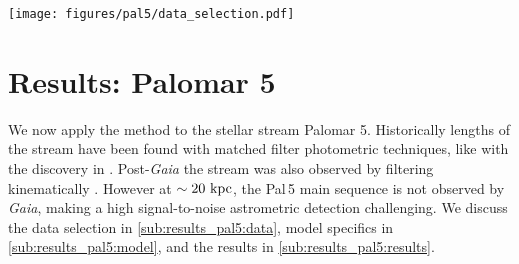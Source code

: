 \documentclass[twocolumn, linenumbers]{aastex631}
\newcommand{\stream}[1]{#1}
\newcommand{\dataarchive}[1]{\textit{#1}}
\newcommand{\Gaia}{\dataarchive{Gaia}}
\newcommand{\parallax}{\varpi}
\begin{document}


    \begin{figure*}[ht]
        \centering
        \texttt{[image: figures/pal5/data\_selection.pdf]}
        \caption{%
            Data selections for \stream{Pal\,5}, within the data cube described
            in \autoref{sub:results_pal5:data}.
            \textbf{Row 1:}
            Proper motion and photometric selections.  \stream{Pal\,5} is
            apparent in the proper motions as a small overdensity. The
            photometric selection is based on a 12 Gyr, [Fe/H] = $-1.2$ MIST
            isochrone, buffered by 0.3 dex. The photometry is also cut to
            \Gaia{}'s $G\leq20$ mag, before applying the isochrone selection.
            In green is plotted an ``on''-stream selection (see $\phi_1, \phi_2$ plot). The stream's isochrone is somewhat apparent, but the
            background contamination is large.
            \textbf{Rows 2 \& 3:}
            Applying the combination of astrometric and photometric selections (Row 1, blue regions),
            plotted for astrometric coordinates $\phi_2, \parallax,
            \mu_{\phi_1}, \mu_{\phi_2}$.  The stream is an identifiable
            overdensity in only $\phi_2$ and errors dominate all other
            coordinates.
            \textbf{Row 2, left:}
            Green points define an``on"-stream region. Light blue points are the background and are used to train the background photometric
            model (\autoref{sub:results_pal5:model}). The \stream{M5} cluster is masked from the stream, cutting into the on-stream selection.
        }
        \label{fig:pal5-data_selection}
    \end{figure*}



\section{Results: Palomar 5} \label{sec:results_pal5}

    We now apply the method to the stellar stream \stream{Palomar 5}.
    Historically lengths of the stream have been found with matched filter
    photometric techniques, like with the discovery in \citet{Odenkirchen+2001}.
    Post-\Gaia{} the stream was also observed by filtering kinematically
    \cite[e.g.,][]{Starkman+2019, Ibata+2021}.  However at $\sim 20 \ \rm{kpc}$,
    the \stream{Pal\,5} main sequence is not observed by \Gaia{}, making a high
    signal-to-noise astrometric detection challenging.  We discuss the data
    selection in \autoref{sub:results_pal5:data}, model specifics in
    \autoref{sub:results_pal5:model}, and the results in
    \autoref{sub:results_pal5:results}.
\end{document}
